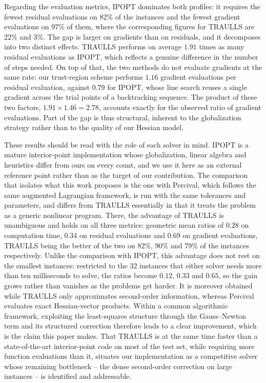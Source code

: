 Regarding the evaluation metrics, IPOPT dominates both profiles: it requires the fewest residual evaluations on 82\% of the instances and the fewest gradient evaluations on 97\% of them, where the corresponding figures for TRAULLS are 22\% and 3\%. The gap is larger on gradients than on residuals, and it decomposes into two distinct effects. TRAULLS performs on average $1.91$ times as many residual evaluations as IPOPT, which reflects a genuine difference in the number of steps needed. On top of that, the two methods do not evaluate gradients at the same rate: our trust-region scheme performs $1.16$ gradient evaluations per residual evaluation, against $0.79$ for IPOPT, whose line search reuses a single gradient across the trial points of a backtracking sequence. The product of these two factors, $1.91 \times 1.46 = 2.78$, accounts exactly for the observed ratio of gradient evaluations. Part of the gap is thus structural, inherent to the globalization strategy rather than to the quality of our Hessian model.

These results should be read with the role of each solver in mind. IPOPT is a mature interior-point implementation whose globalization, linear algebra and heuristics differ from ours on every count, and we use it here as an external reference point rather than as the target of our contribution. The comparison that isolates what this work proposes is the one with Percival, which follows the same augmented Lagrangian framework, is run with the same tolerances and parameters, and differs from TRAULLS essentially in that it treats the problem as a generic nonlinear program. There, the advantage of TRAULLS is unambiguous and holds on all three metrics: geometric mean ratios of $0.28$ on computation time, $0.34$ on residual evaluations and $0.69$ on gradient evaluations, TRAULLS being the better of the two on 82\%, 90\% and 79\% of the instances respectively. Unlike the comparison with IPOPT, this advantage does not rest on the smallest instances: restricted to the 32 instances that either solver needs more than ten milliseconds to solve, the ratios become $0.12$, $0.33$ and $0.65$, so the gain grows rather than vanishes as the problems get harder. It is moreover obtained while TRAULLS only approximates second-order information, whereas Percival evaluates exact Hessian-vector products. Within a common algorithmic framework, exploiting the least-squares structure through the Gauss--Newton term and its structured correction therefore leads to a clear improvement, which is the claim this paper makes. That TRAULLS is at the same time faster than a state-of-the-art interior-point code on most of the test set, while requiring more function evaluations than it, situates our implementation as a competitive solver whose remaining bottleneck -- the dense second-order correction on large instances -- is identified and addressable.
